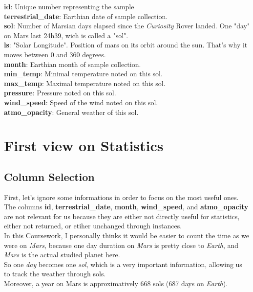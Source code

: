 \documentclass[10pt,a4paper,oneside]{article}
\begin{document}
\textbf{id}: Unique number representing the sample\\
\textbf{terrestrial\_date}: Earthian date of sample collection.\\
\textbf{sol}: Number of Marsian days elapsed since the \textit{Curiosity} Rover landed. One "day" on Mars last 24h39, wich is called a "sol".\\
\textbf{ls}: "Solar Longitude". Position of mars on its orbit around the sun. That's why it moves between 0 and 360 degrees.\\
\textbf{month}: Earthian month of sample collection.\\
\textbf{min\_temp}: Minimal temperature noted on this sol.\\
\textbf{max\_temp}: Maximal temperature noted on this sol.\\
\textbf{pressure}: Pressure noted on this sol.\\
\textbf{wind\_speed}: Speed of the wind noted on this sol.\\
\textbf{atmo\_opacity}: General weather of this sol.

\section{First view on Statistics}

\subsection{Column Selection}
First, let's ignore some informations in order to focus on the most useful ones.\\

The columns \textbf{id}, \textbf{terrestrial\_date}, \textbf{month}, \textbf{wind\_speed}, and \textbf{atmo\_opacity} are not relevant for us because they are either not directly useful for statistics, either not returned, or etiher unchanged through instances.\\

In this Coursework, I personally thinks it would be easier to count the time as we were on \textit{Mars}, because one day duration on \textit{Mars} is pretty close to \textit{Earth}, and \textit{Mars} is the actual studied planet here.\\
So one \textit{day} becomes one \textit{sol}, which is a very important information, allowing us to track the weather through sols.\\
Moreover, a year on Mars is approximatively 668 sols (687 days on \textit{Earth}).\\
\end{document}
